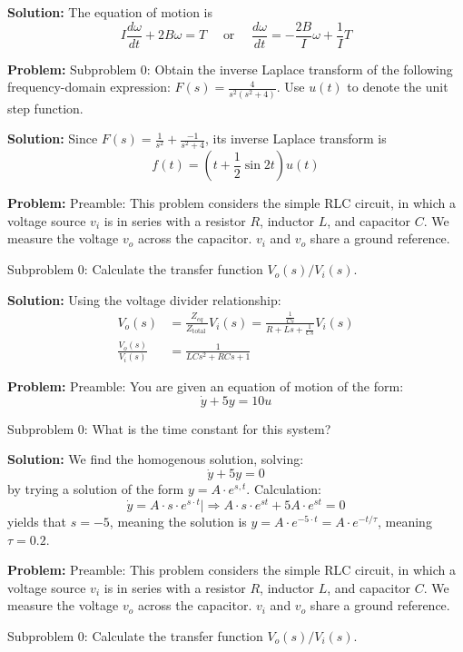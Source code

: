 \documentclass[10pt]{article}
\begin{document}
\textbf{Solution:}
The equation of motion is
\[
\boxed{I \frac{d \omega}{d t}+2 B \omega=T} \quad \text { or } \quad \frac{d \omega}{d t}=-\frac{2 B}{I} \omega+\frac{1}{I} T
\]


\textbf{Problem:}
Subproblem 0: Obtain the inverse Laplace transform of the following frequency-domain expression: $F(s) = \frac{4}{s^2(s^2+4)}$.
Use $u(t)$ to denote the unit step function.


\textbf{Solution:}
Since $F(s) = \frac{1}{s^2} + \frac{-1}{s^2+4}$, its inverse Laplace transform is 
\[
f(t) = \boxed{(t + \frac{1}{2} \sin{2t}) u(t)}
\]


\textbf{Problem:}
Preamble: This problem considers the simple RLC circuit, in which a voltage source $v_{i}$ is in series with a resistor $R$, inductor $L$, and capacitor $C$.  We measure the voltage $v_{o}$ across the capacitor.  $v_{i}$ and $v_{o}$ share a ground reference.

Subproblem 0: Calculate the transfer function \(V_{o}(s) / V_{i}(s)\).


\textbf{Solution:}
Using the voltage divider relationship:
\[
\begin{aligned}
V_{o}(s) &=\frac{Z_{e q}}{Z_{\text {total }}}V_{i}(s)=\frac{\frac{1}{C s}}{R+L s+\frac{1}{C s}} V_{i}(s) \\
\frac{V_{o}(s)}{V_{i}(s)} &=\boxed{\frac{1}{L C s^{2}+R C s+1}}
\end{aligned}
\]


\textbf{Problem:}
Preamble: You are given an equation of motion of the form:
\[
\dot{y}+5 y=10 u
\]

Subproblem 0: What is the time constant for this system?


\textbf{Solution:}
We find the homogenous solution, solving:
\[
\dot{y}+5 y=0
\]
by trying a solution of the form $y=A \cdot e^{s, t}$.
Calculation:
\[
\dot{y}=A \cdot s \cdot e^{s \cdot t} \mid \Rightarrow A \cdot s \cdot e^{s t}+5 A \cdot e^{s t}=0
\]
yields that $s=-5$, meaning the solution is $y=A \cdot e^{-5 \cdot t}=A \cdot e^{-t / \tau}$, meaning $\tau = \boxed{0.2}$.


\textbf{Problem:}
Preamble: This problem considers the simple RLC circuit, in which a voltage source $v_{i}$ is in series with a resistor $R$, inductor $L$, and capacitor $C$.  We measure the voltage $v_{o}$ across the capacitor.  $v_{i}$ and $v_{o}$ share a ground reference.

Subproblem 0: Calculate the transfer function \(V_{o}(s) / V_{i}(s)\).
\end{document}
